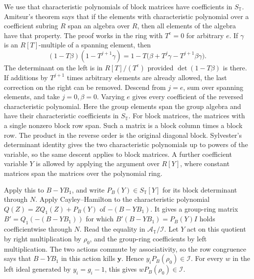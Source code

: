 We use that characteristic polynomials of block matrices have
coefficients in \(S_{\mathbb T}\). Amitsur's theorem says that if
the elements with characteristic polynomial over a coefficient
subring \(R\) span an algebra over \(R\), then all elements of
the algebra have that property.
The proof works in the ring with \(T^e=0\) for arbitrary \(e\).
If \(\gamma\) is an \(R[T]\)-multiple of a spanning element, then
\[
 (1-T\beta)(1-T^{j+1}\gamma)
   =1-T\bigl(\beta+T^j\gamma-T^{j+1}\beta\gamma\bigr).
\]
The determinant on the left is in \(R[T]/(T^e)\) provided
\(\det(1-T\beta)\) is there. If additions by \(T^{j+1}\) times
arbitrary elements are already allowed, the last correction on
the right can be removed. Descend from \(j=e\), sum over spanning
elements, and take \(j=0,\beta=0\). Varying \(e\) gives every
coefficient of the reversed characteristic polynomial.
Here the group elements span the group algebra and have their
characteristic coefficients in \(S_{\mathbb T}\).
For block matrices, the matrices with a single nonzero block row
span. Such a matrix is a block column times a block row.
The product in the reverse order is the original diagonal block.
Sylvester's determinant identity gives the two characteristic
polynomials up to powers of the variable, so the same descent
applies to block matrices. A further coefficient variable \(Y\)
is allowed by applying the argument over \(R[Y]\), where constant
matrices span the matrices over the polynomial ring.

Apply this to \(B-YB_1\), and write \(P_B(Y)\in S_{\mathbb T}[Y]\)
for its block determinant through \(N\).
Apply Cayley--Hamilton to the characteristic polynomial
\(Q(Z)=ZQ_1(Z)+P_B(Y)\) of \(-(B-YB_1)\).
It gives a group-ring matrix \(B'=Q_1(-(B-YB_1))\) for which
\(B'(B-YB_1)=P_B(Y)I\) holds coefficientwise through \(N\).
Read the equality in \(\mathcal A_{\mathbb T}/\mathscr I\).
Let \(Y\) act on this quotient by right multiplication by \(\rho_0\),
and the group-ring coefficients by left multiplication.
The two actions commute by associativity, so the row congruence
says that \(B-YB_1\) in this action kills \(\mathbf y\).
Hence \(y_iP_B(\rho_0)\in\mathscr I\). For every \(w\) in the
left ideal generated by \(y_i=g_i-1\), this gives
\(wP_B(\rho_0)\in\mathscr I\).

